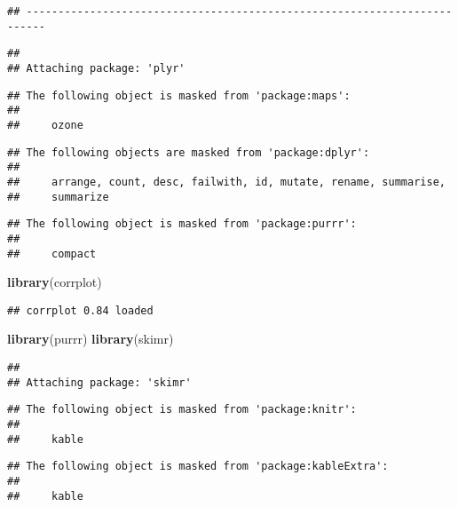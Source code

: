 \documentclass[]{article}
\newenvironment{Shaded}{\begin{snugshade}}{\end{snugshade}}
\newcommand{\KeywordTok}[1]{\textcolor[rgb]{0.13,0.29,0.53}{\textbf{#1}}}
\newcommand{\NormalTok}[1]{#1}
\begin{document}
\begin{verbatim}
## -------------------------------------------------------------------------
\end{verbatim}

\begin{verbatim}
## 
## Attaching package: 'plyr'
\end{verbatim}

\begin{verbatim}
## The following object is masked from 'package:maps':
## 
##     ozone
\end{verbatim}

\begin{verbatim}
## The following objects are masked from 'package:dplyr':
## 
##     arrange, count, desc, failwith, id, mutate, rename, summarise,
##     summarize
\end{verbatim}

\begin{verbatim}
## The following object is masked from 'package:purrr':
## 
##     compact
\end{verbatim}

\begin{Shaded}
\begin{Highlighting}[]
\KeywordTok{library}\NormalTok{(corrplot) }
\end{Highlighting}
\end{Shaded}

\begin{verbatim}
## corrplot 0.84 loaded
\end{verbatim}

\begin{Shaded}
\begin{Highlighting}[]
\KeywordTok{library}\NormalTok{(purrr)}
\KeywordTok{library}\NormalTok{(skimr)}
\end{Highlighting}
\end{Shaded}

\begin{verbatim}
## 
## Attaching package: 'skimr'
\end{verbatim}

\begin{verbatim}
## The following object is masked from 'package:knitr':
## 
##     kable
\end{verbatim}

\begin{verbatim}
## The following object is masked from 'package:kableExtra':
## 
##     kable
\end{verbatim}
\end{document}
